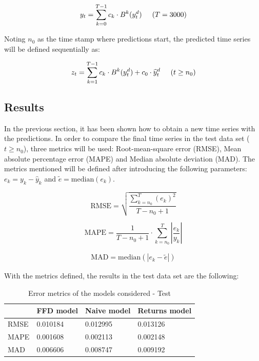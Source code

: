 \documentclass[a4paper]{article}
\begin{document}
\begin{equation*}
y_t = \sum_{k = 0}^{T - 1} c_k \cdot B^k (y_t^d) \hspace{.5cm} (T = 3000)
\end{equation*}

Noting $n_0$ as the time stamp where predictions start, the predicted time 
series will be defined sequentially as:

\begin{equation*}
	z_t = \sum_{k = 1}^{T - 1} c_k \cdot B^k (y_t^d) + c_0 \cdot 
	\widehat{y}_t^d \hspace{.5cm} (t \geq n_0)
\end{equation*}

\subsection{Results}
In the previous section, it has been shown how to obtain a new time series 
with the predictions. In order to compare the final time series in the test 
data set ($t \geq n_0$), three metrics will be used: Root-mean-square error 
(RMSE), Mean absolute percentage error (MAPE) and Median absolute deviation 
(MAD). The metrics mentioned will be defined after introducing the following 
parameters: $e_k = y_k - \widehat{y}_k$ and $\tilde{e} = 
\text{median}(e_k)$.

\begin{equation*}
	\text{RMSE} = \sqrt{\frac{\sum_{k = n_0}^{T} (e_k)^2}
	{T - n_0 + 1}} 
\end{equation*}

\begin{equation*}
	\text{MAPE} = \frac{1}{T - n_0 + 1} \cdot \sum_{k = n_0}^T 
	\left| \frac{e_k}{y_k} \right| 
\end{equation*}

\begin{align*}
	\text{MAD} = \text{median}(|e_k - \tilde{e}|)	
\end{align*}

With the metrics defined, the results in the test data set are the 
following:

\begin{table}[htbp]
\centering
	\caption{Error metrics of the models considered - Test}
	\label{tab:MetricsToy}
	\vspace{.1cm}
	\begin{tabular}{ |C{2.5cm}|C{2.5cm}|C{2.5cm}|C{2.5cm}| }
		\hline
			 & FFD model & Naive model & Returns model\\
		\hline
		RMSE & 0.010184 & 0.012995 & 0.013126\\
		MAPE & 0.001608 & 0.002113 & 0.002148\\
		MAD  & 0.006606 & 0.008747 & 0.009192\\		
		\hline
	\end{tabular}
\end{table}
\end{document}
